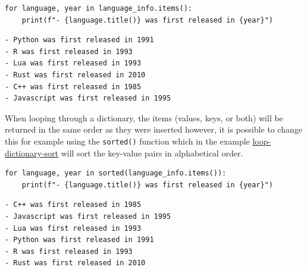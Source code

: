 \documentclass[10pt]{book}
\begin{document}
\label{orgfad6b86}
\begin{verbatim}
for language, year in language_info.items():
    print(f"- {language.title()} was first released in {year}")
\end{verbatim}

\label{orga413beb}
\begin{verbatim}
- Python was first released in 1991
- R was first released in 1993
- Lua was first released in 1993
- Rust was first released in 2010
- C++ was first released in 1985
- Javascript was first released in 1995
\end{verbatim}


When looping through a dictionary, the items (values, keys, or both) will be returned in the same order as they were inserted however, it is possible to change this for example using the \texttt{sorted()} function which in the example \hyperref[org3d199fe]{loop-dictionary-sort} will sort the key-value pairs in alphabetical order.

\label{org3d199fe}
\begin{verbatim}
for language, year in sorted(language_info.items()):
    print(f"- {language.title()} was first released in {year}")
\end{verbatim}

\label{org57255fb}
\begin{verbatim}
- C++ was first released in 1985
- Javascript was first released in 1995
- Lua was first released in 1993
- Python was first released in 1991
- R was first released in 1993
- Rust was first released in 2010
\end{verbatim}
\end{document}
